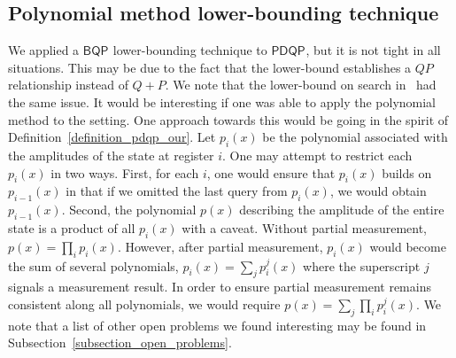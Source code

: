 \documentclass[10pt,a4paper]{article}
\newcommand{\queryamount}[0]{\ensuremath{Q}\xspace}
\newcommand{\abilityamount}[0]{\ensuremath{P}\xspace} %
\newcommand{\compclass}[2][]{\ensuremath{\mathsf{#2}^{#1}}\xspace}
\newcommand{\pdqpname}[0]{\compclass{PDQP}}
\newcommand{\bqpname}[0]{\compclass{BQP}}
\begin{document}
\subsection{Polynomial method lower-bounding technique}\label{subsection_polynomial_method}

We applied a \bqpname lower-bounding technique to \pdqpname, but it is not tight in all situations. This may be due to the fact that the lower-bound establishes a $\queryamount\abilityamount$ relationship instead of $\queryamount+\abilityamount$. We note that the lower-bound on search in~\cite{space_above_bqp} had the same issue. It would be interesting if one was able to apply the polynomial method to the setting. One approach towards this would be going in the spirit of Definition~\ref{definition_pdqp_our}. Let $p_i(x)$ be the polynomial associated with the amplitudes of the state at register $i$. One may attempt to restrict each $p_i(x)$ in two ways. First, for each $i$, one would ensure that $p_i(x)$ builds on $p_{i-1}(x)$ in that if we omitted the last query from $p_i(x)$, we would obtain $p_{i-1}(x)$. Second, the polynomial $p(x)$ describing the amplitude of the entire state is a product of all $p_i(x)$ with a caveat. Without partial measurement, $p(x)=\prod_i p_i(x)$. However, after partial measurement, $p_i(x)$ would become the sum of several polynomials, $p_i(x)=\sum_j p_i^j(x)$ where the superscript $j$ signals a measurement result. In order to ensure partial measurement remains consistent along all polynomials, we would require $p(x)=\sum_j \prod_i p_i^j(x)$. We note that a list of other open problems we found interesting may be found in Subsection~\ref{subsection_open_problems}.
\end{document}
